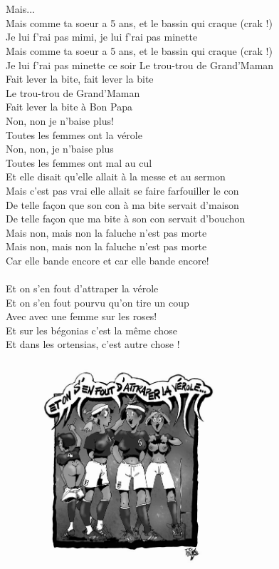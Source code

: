 \\\\Mais...
\\Mais comme ta soeur a 5 ans, et le bassin qui craque (crak !)
\\Je lui f'rai pas mimi, je lui f'rai pas minette
\\Mais comme ta soeur a 5 ans, et le bassin qui craque (crak !)
\\Je lui f'rai pas minette ce soir
\breakpage
Le trou-trou de Grand'Maman
\\Fait lever la bite, fait lever la bite
\\Le trou-trou de Grand'Maman
\\Fait lever la bite à Bon Papa
\\Non, non je n'baise plus!
\\Toutes les femmes ont la vérole
\\Non, non, je n'baise plus
\\Toutes les femmes ont mal au cul
\\Et elle disait qu'elle allait à la messe et au sermon
\\Mais c'est pas vrai elle allait se faire farfouiller le con
\\De telle façon que son con à ma bite servait d'maison
\\De telle façon que ma bite à son con servait d'bouchon
\\Mais non, mais non la faluche n'est pas morte
\\Mais non, mais non la faluche n'est pas morte
\\Car elle bande encore et car elle bande encore!
\\\\Et on s'en fout d'attraper la vérole
\\Et on s'en fout pourvu qu'on tire un coup
\\Avec avec une femme sur les roses!
\\Et sur les bégonias c'est la même chose
\\Et dans les ortensias, c'est autre chose !
\begin{figure}[h!]
\centering
   \includegraphics[width=0.60\textwidth]{images/veroles.png}
 \end{figure}

\breakpage